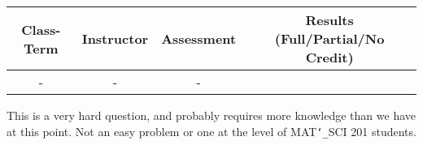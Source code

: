 \begin{outcomes}
\begin{center}
	\begin{tabular}{cccc}
		\hline\hline
                Class-Term & Instructor & Assessment & Results (Full/Partial/No Credit) \\
		\hline
                - & - & - &  \\
		\hline
	\end{tabular}
\end{center}
\end{outcomes}

\begin{comments}

This is a very hard question, and probably requires more knowledge than we have at this point. Not an easy problem or one at the level of MAT\texttt{\char`_}SCI 201 students. 

\end{comments}
